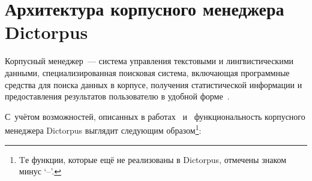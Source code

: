 
\section{Архитектура корпусного менеджера Dictorpus} \label{sect_arch_corpus_manager}

Корпусный менеджер~--- система управления текстовыми и лингвистическими данными, 
специализированная поисковая система, включающая программные средства для поиска данных в корпусе, получения статистической информации и предоставления результатов пользователю 
в удобной форме~\cite[с.~3]{Zakharov2005}.

С~учётом возможностей, описанных в работах~\cite[с.~414--415]{Kibrik2019} и~\cite[с.~10--11]{Zakharov2005} 
функциональность корпусного менеджера Dictorpus выглядит следующим образом\footnote{Tе функции, 
которые ещё не реализованы в Dictorpus, отмечены знаком минус `--'.}:
